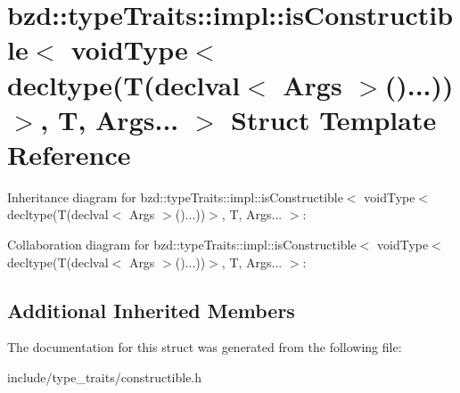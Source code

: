 \hypertarget{structbzd_1_1typeTraits_1_1impl_1_1isConstructible_3_01voidType_3_01decltype_07T_07declval_3_01Ab708546180c4980af3729b760eee75ea}{}\section{bzd\+:\+:type\+Traits\+:\+:impl\+:\+:is\+Constructible$<$ void\+Type$<$ decltype(T(declval$<$ Args $>$()...))$>$, T, Args... $>$ Struct Template Reference}
\label{structbzd_1_1typeTraits_1_1impl_1_1isConstructible_3_01voidType_3_01decltype_07T_07declval_3_01Ab708546180c4980af3729b760eee75ea}


Inheritance diagram for bzd\+:\+:type\+Traits\+:\+:impl\+:\+:is\+Constructible$<$ void\+Type$<$ decltype(T(declval$<$ Args $>$()...))$>$, T, Args... $>$\+:


Collaboration diagram for bzd\+:\+:type\+Traits\+:\+:impl\+:\+:is\+Constructible$<$ void\+Type$<$ decltype(T(declval$<$ Args $>$()...))$>$, T, Args... $>$\+:
\subsection*{Additional Inherited Members}


The documentation for this struct was generated from the following file\+:\begin{DoxyCompactItemize}
\item 
include/type\+\_\+traits/constructible.\+h\end{DoxyCompactItemize}
